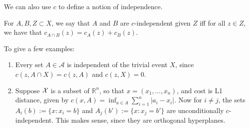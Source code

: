 \documentclass{article}
\begin{document}
\begin{wip}
We can also use $c$ to define a notion of independence.

\begin{defn}[$c$-independence]
For $A,B,Z \subset X$,
we say that $A$ and $B$ are $c$-independent given $Z$ iff
for all $z \in Z$, we have that
$c_{A\cap B}(z) = c_{A}(z) + c_{B}(z)$.
\end{defn}

To give a few examples:
\begin{enumerate}
    \item Every set $A \in\mathcal A$ is independent of the trivial event $X$, since
        $
            c(z, A\cap X) = c(z, A)
        $
        and $c(z, X) = 0$.
    \item Suppose $\mathcal X$ is a subset of $\mathbb R^n$, so that $x = (x_1, \ldots, x_n)$, and cost is L1 distance, given by $c(x,A) = \inf_{a \in A} \sum_{i=1}^n {|a_i - x_i|}$. Now for $i\ne j$,
    the sets $A_i(b) := \{ x : x_i = b \}$
    and $A_j(b') := \{x : x_j = b' \}$ are unconditionally $c$-independent.
    This makes sense, since they are orthogonal hyperplanes.

\end{enumerate}


\end{wip}
\end{document}
